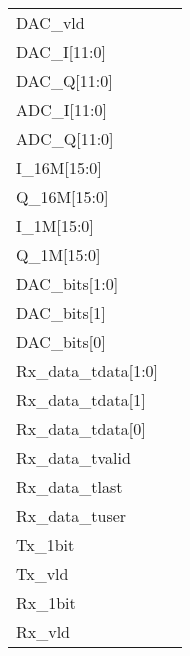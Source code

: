 \documentclass[journal,twoside]{IEEEtran}
\begin{document}
\begin{figure*}
  \setlength{\tabcolsep}{2pt}
  \sffamily\notsotiny
  \newcommand\Modulation{QPSK}%
  \newcommand\isBPSK0%
  \newcommand\Color{mygreen}
  \begin{tabularx}{\linewidth}{@{}lX@{}}
    DAC\_vld &  \\
    DAC\_I[11:0] &  \\
    DAC\_Q[11:0] &  \\
    ADC\_I[11:0] &  \\
    ADC\_Q[11:0] &  \\
    I\_16M[15:0] &  \\
    Q\_16M[15:0] &  \\
    I\_1M[15:0] &  \\
    Q\_1M[15:0] &  \\
    DAC\_bits[1:0] &  \\
    DAC\_bits[1] &  \\
    DAC\_bits[0] &  \\
    Rx\_data\_tdata[1:0] &  \\
    Rx\_data\_tdata[1] &  \\
    Rx\_data\_tdata[0] &  \\
    Rx\_data\_tvalid &  \\
    Rx\_data\_tlast &  \\
    Rx\_data\_tuser &  \\
    Tx\_1bit &  \\
    Tx\_vld &  \\
    Rx\_1bit &  \\
    Rx\_vld &  \\
  \end{tabularx}%
\end{figure*}
\end{document}
